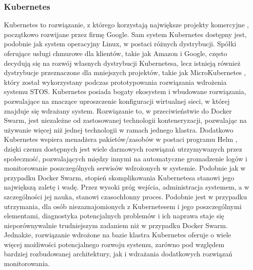 \subsubsection{Kubernetes}
Kubernetes to rozwiązanie, z którego korzystają największe projekty komercyjne \cite{googleKubernetes}, początkowo rozwijane przez firmę Google. Sam system Kubernetes dostępny jest, podobnie jak system operacyjny Linux, w postaci różnych dystrybucji. Spółki oferujące usługi chmurowe dla klientów, takie jak Amazon i Google, często decydują się na rozwój własnych dystrybucji Kubernetesa, lecz istnieją również dystrybucje przeznaczone dla mniejszych projektów, takie jak MicroKubernetes \cite{microk8s}, który został wykorzystany podczas prototypowania rozwiązania wdrożenia systemu STOS. Kubernetes posiada bogaty ekosystem i wbudowane rozwiązania, pozwalające na znaczące uproszczenie konfiguracji wirtualnej sieci, w której znajduje się wdrażany system. Rozwiązanie to, w przeciwieństwie do Docker Swarm, jest niezależne od zastosowanej technologii konteneryzacji, pozwalając na używanie więcej niż jednej technologii w ramach jednego klastra. Dodatkowo Kubernetes wspiera menadżera pakietów/zasobów w postaci programu Helm \cite{k8sHelm}, dzięki czemu dostępnych jest wiele darmowych rozwiązań utrzymywanych przez społeczność, pozwalających między innymi na automatyczne gromadzenie logów i monitorowanie poszczególnych serwisów wdrożonych w systemie. Podobnie jak w przypadku Docker Swarm, stopień skomplikowania Kubernetesa stanowi jego największą zaletę i wadę. Przez wysoki próg wejścia, administracja systemem, a w szczególności jej nauka, stanowi czasochłonny proces. Podobnie jest w przypadku utrzymania, dla osób niezaznajomionych z Kubernetesem i jego poszczególnymi elementami, diagnostyka potencjalnych problemów i ich naprawa staje się nieporównywalnie trudniejszym zadaniem niż w przypadku Docker Swarm. Jednakże, rozwiązanie wdrożone na bazie klastra Kubernetes oferuje o wiele więcej możliwości potencjalnego rozwoju systemu, zarówno pod względem bardziej rozbudowanej architektury, jak i wdrażania dodatkowych rozwiązań monitorowania.

